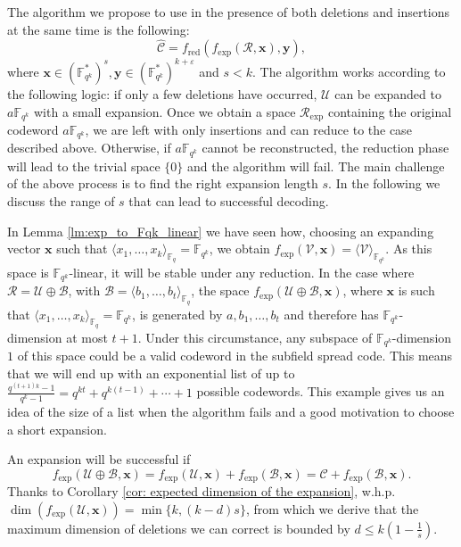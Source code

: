 \documentclass{article}
\newcommand{\Fq}{\mathbb{F}_{q}}
\newcommand{\Fqk}{\mathbb{F}_{q^k}}
\newcommand{\calB}{\mathcal{B}}
\newcommand{\calC}{\mathcal{C}}
\newcommand{\calR}{\mathcal{R}}
\newcommand{\calU}{\mathcal{U}}
\newcommand{\calV}{\mathcal{V}}
\newcommand{\fred}{f_{\mathrm{red}}}
\newcommand{\fexp}{f_{\mathrm{exp}}}
\newcommand{\Span}[2]{\langle #2 \rangle_{#1}}
\begin{document}
\medskip

The algorithm we propose to use in the presence of both deletions and insertions at the same time is the following:
\begin{equation}
    \label{eq:Alg1}
    \hat{\calC} = \fred(\fexp(\calR,\bm x),\bm y),
\end{equation}
where $\bm x \in (\Fqk^*)^s, \bm y \in (\Fqk^*)^{k+\varepsilon}$ and $s < k$.
The algorithm works according to the following logic: if only a few deletions have occurred, $\calU$ can be expanded to $a\Fqk$ with a small expansion. Once we obtain a space $\calR_{\mathrm{exp}}$ containing the original codeword $a\Fqk$, we are left with only insertions and can reduce to the case described above. Otherwise, if $a\Fqk$ cannot be reconstructed, the reduction phase will lead to the trivial space $\{0\}$ and the algorithm will fail.
The main challenge of the above process is to find the right expansion length $s.$
In the following we discuss the range of $s$ that can lead to successful decoding.

\smallskip 

In Lemma \ref{lm:exp_to_Fqk_linear} we have seen how, choosing an expanding vector $\bm x$ such that $\Span{\Fq}{x_1,\ldots,x_{k}} = \Fqk$, we obtain $\fexp(\calV,\bm x) = \Span{\Fqk}{\calV}.$
As this space is $\Fqk$-linear, it will be stable under any reduction.
In the case where $\calR = \calU \oplus \calB$, with $\calB = \Span{\Fq}{b_1, \ldots, b_t}$, the space $\fexp(\calU \oplus \calB, \bm x)$, where $\bm x$ is such that $\Span{\Fq}{x_1,\ldots,x_{k}} = \Fqk$, is generated by $a, b_1, \ldots, b_t$ and therefore has $\Fqk$-dimension at most $t+1$. Under this circumstance, any subspace of $\Fqk$-dimension $1$ of this space could be a valid codeword in the subfield spread code.
This means that we will end up with an exponential list of up to $\frac{q^{(t+1)k}-1}{q^k - 1}= q^{kt} + q^{k(t-1)} + \cdots + 1$ possible codewords.
This example gives us an idea of the size of a list when the algorithm fails and a good motivation to choose a short expansion. 

\medskip

An expansion will be successful if $$\fexp(\calU\oplus\calB,\bm x) =\fexp(\calU,\bm x)+\fexp(\calB,\bm x)= \calC+\fexp(\calB,\bm x).$$ Thanks to Corollary \ref{cor: expected dimension of the expansion}, w.h.p. $\dim(\fexp(\calU,\bm x)) = \min\{k, (k-d)s\}$, from which we derive that the maximum dimension of deletions we can correct is bounded by $d \leq k\left(1- \frac{1}{s}\right)$. 
\end{document}
